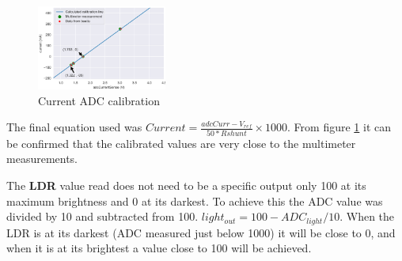 \begin{figure}
	\begin{center}
		\includegraphics[width=0.38\textwidth]{./Figures/A8/currentA8.png}
	\end{center}
	\caption{Current ADC calibration}
	\label{fig:A8curr}
\end{figure}
The final equation used was  $Current = \frac{adcCurr-V_{ref}}{50*Rshunt}\times 1000$. From figure \ref{fig:A8curr} it can be confirmed that the calibrated values are very close to the multimeter measurements. 

The \textbf{LDR} value read does not need to be a specific output only 100 at its maximum brightness and 0 at its darkest. To achieve this the ADC value was divided by 10 and subtracted from 100. $light_{out}=100-ADC_{light}/10$. When the LDR is at its darkest (ADC measured just below 1000) it will be close to 0, and when it is at its brightest a value close to 100 will be achieved.
